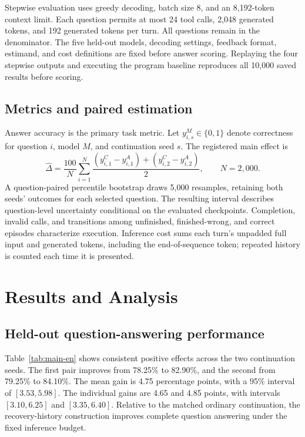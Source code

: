 Stepwise evaluation uses greedy decoding, batch size 8, and an 8,192-token context limit. Each question permits at most 24 tool calls, 2,048 generated tokens, and 192 generated tokens per turn. All questions remain in the denominator. The five held-out models, decoding settings, feedback format, estimand, and cost definitions are fixed before answer scoring. Replaying the four stepwise outputs and executing the program baseline reproduces all 10,000 saved results before scoring.

\subsection{Metrics and paired estimation}

Answer accuracy is the primary task metric. Let $y_{i,s}^M\in\{0,1\}$ denote correctness for question $i$, model $M$, and continuation seed $s$. The registered main effect is
\begin{equation}
 \widehat\Delta=\frac{100}{N}\sum_{i=1}^{N}
 \frac{(y_{i,1}^{C}-y_{i,1}^{A})+(y_{i,2}^{C}-y_{i,2}^{A})}{2},
 \qquad N=2{,}000.
\end{equation}
A question-paired percentile bootstrap draws 5,000 resamples, retaining both seeds' outcomes for each selected question. The resulting interval describes question-level uncertainty conditional on the evaluated checkpoints. Completion, invalid calls, and transitions among unfinished, finished-wrong, and correct episodes characterize execution. Inference cost sums each turn's unpadded full input and generated tokens, including the end-of-sequence token; repeated history is counted each time it is presented.

\section{Results and Analysis}

\subsection{Held-out question-answering performance}

\begin{table}[htbp]
 \centering
 \caption{Results on the same 2,000 project-held-out questions. Differences and confidence intervals are in percentage points.}
 \label{tab:main-en}
 \RecoveryMainTableEN
\end{table}

Table~\ref{tab:main-en} shows consistent positive effects across the two continuation seeds. The first pair improves from 78.25\% to 82.90\%, and the second from 79.25\% to 84.10\%. The mean gain is 4.75 percentage points, with a 95\% interval of $[3.53,5.98]$. The individual gains are 4.65 and 4.85 points, with intervals $[3.10,6.25]$ and $[3.35,6.40]$. Relative to the matched ordinary continuation, the recovery-history construction improves complete question answering under the fixed inference budget.

